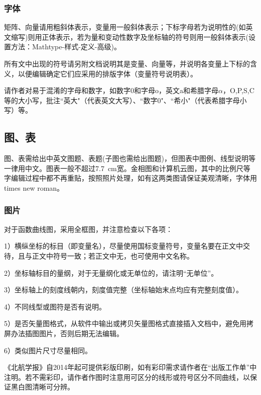 \documentclass[10.5pt,twocolumn]{jthu-st}
\begin{document}
\subsubsection{字体}
矩阵、向量请用粗斜体表示，变量用一般斜体表示；下标字母若为说明性的(如英文缩写)则用正体表示，若为量和变动性数字及坐标轴的符号则用一般斜体表示(设置方法：Mathtype-样式-定义-高级)。

所有文中出现的符号请另附文档说明其是变量、向量等，并说明各变量上下标的含义，以便编辑确定它们应采用的排版字体（变量符号说明表）。

请作者对易于混淆的字母和数字，如数字0和字母o，英文a和希腊字母$\alpha$，O,P,S,C等的大小写，批注``英大"（代表英文大写）、``数字0"、``希小"（代表希腊字母小写）等。

\subsection{图、表}
图、表需给出中英文图题、表题(子图也需给出图题)，但图表中图例、线型说明等一律用中文。图表一般不超过7.7\ cm宽。金相图和计算机云图，其中的比例尺等字编辑过程中都不再重贴，按照照片处理，如有这两类图请保证美观清晰，字体用times new roman。

\subsubsection{图片}
对于函数曲线图，采用全框图，并注意检查以下各项：

1）横纵坐标的标目（即变量名），尽量使用国标变量符号，变量名要在正文中交待，且与正文中符号一致；若正文中无，也可使用中文名称。

2）坐标轴标目的量纲，对于无量纲化或无单位的，请注明``无单位”。

3）坐标轴上的刻度线朝内，刻度值完整（坐标轴始末点均应有完整刻度值）。

4）不同线型或图符是否有说明。

5）是否矢量图格式，从软件中输出或拷贝矢量图格式直接插入文档中，避免用拷屏办法插图图片，否则后期无法编辑。

6）类似图片尺寸尽量相同。

《北航学报》自2014年起可提供彩版印刷，如有彩印需求请作者在“出版工作单”中注明。若不需彩印，请作者作图时注意用可区分的线形或符号区分不同曲线，以保证黑白图清晰可分辨。 
\end{document}

